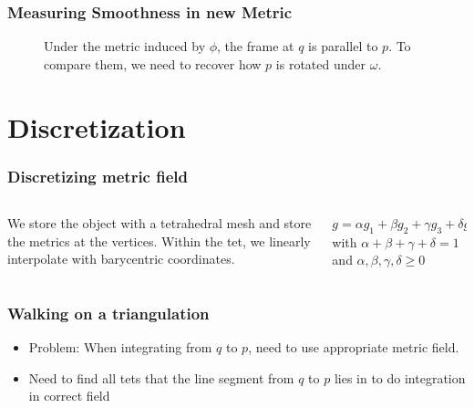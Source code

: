 \documentclass[
	11pt, %
	aspectratio=169, %
]{beamer}
\begin{document}
\begin{frame}
	\frametitle{Measuring Smoothness in new Metric}
	\begin{figure}[htb]
		\centering
		\def\svgwidth{0.5\linewidth}
		
		\caption{Under the metric induced by $\phi$, the frame at $q$ is parallel to $p$.
		To compare them, we need to recover how $p$ is rotated under $\omega$.}
		\label{fig:rotation}
	\end{figure}
\end{frame}


\section{Discretization}

\begin{frame}
	\frametitle{Discretizing metric field}
	\begin{columns}[c] %
	
		\begin{column}{0.65\textwidth} %
			\begin{figure}[htb]
				\centering
				\def\svgwidth{0.6\linewidth}
				
				\label{fig:discretization}
			\end{figure}
			We store the object with a tetrahedral mesh and store
			the metrics at the vertices. Within the tet, we linearly interpolate with barycentric coordinates.
		\end{column}
		\begin{column}{0.35\textwidth} %
			\begin{figure}[htb]
				\centering
				\def\svgwidth{\linewidth}
				
				\label{fig:tet}
			\end{figure}
			$g=\alpha g_1 + \beta g_2 + \gamma g_3 + \delta g_4$ with $\alpha+\beta+\gamma+\delta=1$
			and $\alpha,\beta,\gamma,\delta \ge 0$
		\end{column}
	\end{columns}
\end{frame}


\begin{frame}
	\frametitle{Walking on a triangulation}
	\begin{itemize}
		\item Problem: When integrating from $q$ to $p$, need
		to use appropriate metric field.
		\item Need to find all tets that the line segment from $q$ to $p$ lies in to
		do integration in correct field
		\begin{figure}[htb]
			\centering
			\def\svgwidth{0.9\linewidth}
			
			\label{fig:problem}
		\end{figure}
	\end{itemize}
	
\end{frame}
\end{document}
